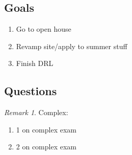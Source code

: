 \documentclass[11pt]{article}
\theoremstyle{remark}
\newtheorem{remark}{Remark}
\begin{document}
\subsection{Goals}

\begin{enumerate}
	\item Go to open house
	\item Revamp site/apply to summer stuff
	\item Finish DRL
\end{enumerate}

\subsection{Questions}

\begin{remark}
Complex:
\begin{enumerate}
	\item 1 on complex exam
	\item 2 on complex exam
\end{enumerate}
\end{remark}
\end{document}

